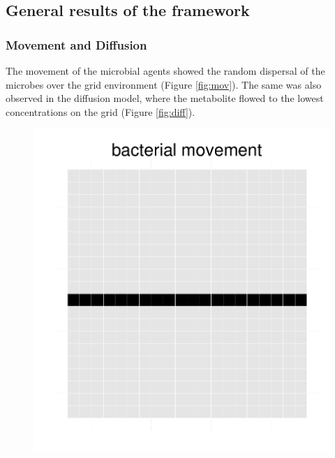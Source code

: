 \subsection{General results of the framework}
\subsubsection{Movement and Diffusion}
The movement of the microbial agents showed the random dispersal of the microbes over the grid environment (Figure \hyperref[fig:mov]{\ref{fig:mov}}). The same was also observed in the diffusion model, where the metabolite flowed to the lowest concentrations on the grid (Figure \hyperref[fig:diff]{\ref{fig:diff}}).

\begin{figure}[h!]
  \centering
  \begin{minipage}[t]{0.3\textwidth}
    \includegraphics[width=\textwidth]{mov1.pdf}
  \end{minipage}
  \begin{minipage}[t]{0.3\textwidth}

\end{minipage}
\end{figure}
